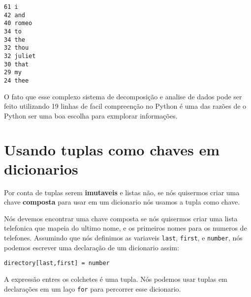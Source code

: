\beforeverb
\begin{verbatim}
61 i
42 and
40 romeo
34 to
34 the
32 thou
32 juliet
30 that
29 my
24 thee
\end{verbatim}
\afterverb
%
O fato que esse complexo sistema de decomposição e analise de dados
pode ser feito utilizando 19 linhas de facil compreenção no Python
é uma das razões de o Python ser uma boa escolha para
exmplorar informações.

\section{Usando tuplas como chaves em dicionarios}


Por conta de tuplas serem {\bf imutaveis} e listas não, se nós quisermos
criar uma chave {\bf composta} para usar em um dicionario nós usamos a 
tupla como chave.

Nós devemos encontrar uma chave composta se nós quisermos criar
uma lista telefonica que mapeia do ultimo nome, e os primeiros nomes
para os numeros de telefones. Assumindo que nós definimos as
variaveis {\tt last}, {\tt first}, e {\tt number}, nós podemos
escrever uma declaração de um dicionario assim:

\beforeverb
\begin{verbatim}
directory[last,first] = number
\end{verbatim}
\afterverb
%
A expressão entres os colchetes é uma tupla. Nós podemos usar
tuplas em declarações em um laço {\tt for} para percorrer esse
dicionario.

